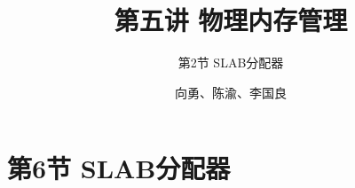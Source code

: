 


\title[第5讲]{第五讲 物理内存管理} %
\subtitle{第2节 SLAB分配器}
\author{向勇、陈渝、李国良} %



\begin{frame}
\titlepage %
\end{frame}


\section{第6节 SLAB分配器}%
